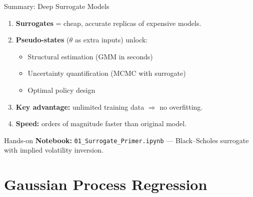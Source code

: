 \documentclass[aspectratio=169,11pt]{beamer}
\begin{document}
\begin{frame}{Summary: Deep Surrogate Models}
\begin{enumerate}
  \item \textbf{Surrogates} = cheap, accurate replicas of expensive models.
  \item \textbf{Pseudo-states} ($\theta$ as extra inputs) unlock:
  \begin{itemize}
    \item Structural estimation (GMM in seconds)
    \item Uncertainty quantification (MCMC with surrogate)
    \item Optimal policy design
  \end{itemize}
  \item \textbf{Key advantage:} unlimited training data $\Rightarrow$ no overfitting.
  \item \textbf{Speed:} orders of magnitude faster than original model.
\end{enumerate}

\vspace{0.3cm}
\begin{block}{Hands-on}
\textbf{Notebook:} \texttt{01\_Surrogate\_Primer.ipynb} --- Black--Scholes surrogate with implied volatility inversion.
\end{block}
\end{frame}

\section{Gaussian Process Regression}
\end{document}
